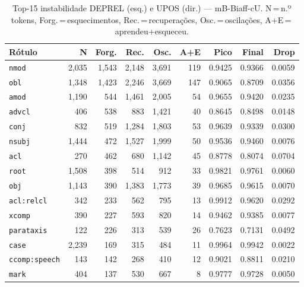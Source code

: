 

\begin{table}[ht]
\centering
\caption{Top-15 instabilidade DEPREL (esq.) e UPOS (dir.) --- mB-Biaff-cU. N\,=\,n.º tokens, Forg.\,=\,esquecimentos, Rec.\,=\,recuperações, Osc.\,=\,oscilações, A+E\,=\,aprendeu+esqueceu.}
\label{tab:inst-predictions-results-mbert-biaffine}
\begin{minipage}[t]{0.54\linewidth}
\centering\tiny
\begin{tabular}{lrrrrrrrr}
\toprule
\textbf{Rótulo} & \textbf{N} & \textbf{Forg.} & \textbf{Rec.} & \textbf{Osc.} & \textbf{A+E} & \textbf{Pico} & \textbf{Final} & \textbf{Drop} \\
\midrule
\texttt{nmod} & 2,035 & 1,543 & 2,148 & 3,691 & 119 & 0.9425 & 0.9366 & 0.0059 \\
\texttt{obl} & 1,348 & 1,423 & 2,246 & 3,669 & 147 & 0.9065 & 0.8709 & 0.0356 \\
\texttt{amod} & 1,190 & 544 & 1,461 & 2,005 & 54 & 0.9655 & 0.9420 & 0.0235 \\
\texttt{advcl} & 406 & 538 & 883 & 1,421 & 40 & 0.8645 & 0.8498 & 0.0148 \\
\texttt{conj} & 832 & 519 & 1,284 & 1,803 & 53 & 0.9639 & 0.9339 & 0.0300 \\
\texttt{nsubj} & 1,444 & 472 & 1,527 & 1,999 & 50 & 0.9536 & 0.9460 & 0.0076 \\
\texttt{acl} & 270 & 462 & 680 & 1,142 & 45 & 0.8778 & 0.8074 & 0.0704 \\
\texttt{root} & 1,508 & 398 & 514 & 912 & 33 & 0.9821 & 0.9761 & 0.0060 \\
\texttt{obj} & 1,143 & 390 & 1,383 & 1,773 & 39 & 0.9685 & 0.9615 & 0.0070 \\
\texttt{acl\!:\!relcl} & 342 & 233 & 562 & 795 & 13 & 0.9912 & 0.9620 & 0.0292 \\
\texttt{xcomp} & 390 & 227 & 593 & 820 & 14 & 0.9462 & 0.9385 & 0.0077 \\
\texttt{parataxis} & 122 & 226 & 313 & 539 & 26 & 0.7623 & 0.7131 & 0.0492 \\
\texttt{case} & 2,239 & 169 & 315 & 484 & 11 & 0.9964 & 0.9942 & 0.0022 \\
\texttt{ccomp\!:\!speech} & 143 & 142 & 268 & 410 & 12 & 0.9021 & 0.8811 & 0.0210 \\
\texttt{mark} & 404 & 137 & 530 & 667 & 8 & 0.9777 & 0.9728 & 0.0050 \\
\bottomrule
\end{tabular}
\end{minipage}

\end{table}
